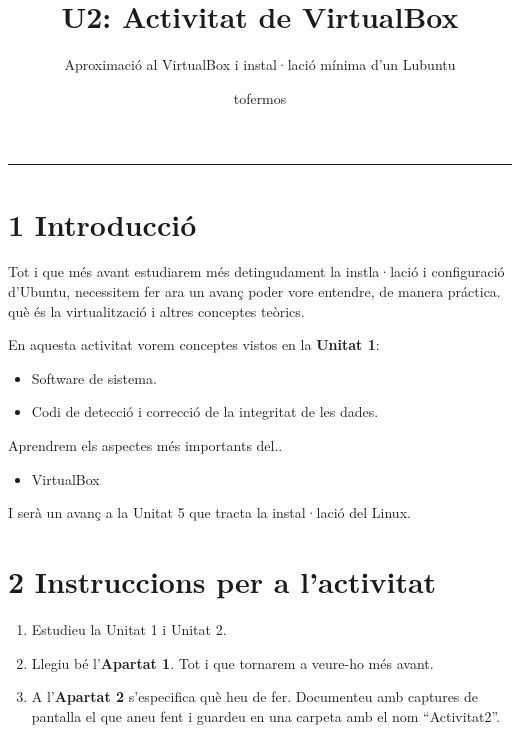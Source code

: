 \documentclass[
  12 pt,
  a4paper,
]{article}
\title{U2: Activitat de VirtualBox}
\subtitle{Aproximació al VirtualBox i instal·lació mínima d'un Lubuntu}
\author{tofermos}
\date{}
\providecommand{\tightlist}{%
  \setlength{\itemsep}{0pt}\setlength{\parskip}{0pt}}
\begin{document}
\maketitle

{
\setcounter{tocdepth}{2}
\tableofcontents
}
\newpage
\renewcommand\tablename{Tabla}

\begin{center}\rule{0.5\linewidth}{0.5pt}\end{center}

\section{1 Introducció}\label{introducciuxf3}

Tot i que més avant estudiarem més detingudament la instla·lació i
configuració d'Ubuntu, necessitem fer ara un avanç poder vore entendre,
de manera práctica. què és la virtualització i altres conceptes teòrics.

En aquesta activitat vorem conceptes vistos en la \textbf{Unitat 1}:

\begin{itemize}
\item
  Software de sistema.
\item
  Codi de detecció i correcció de la integritat de les dades.
\end{itemize}

Aprendrem els aspectes més importants del..

\begin{itemize}
\tightlist
\item
  VirtualBox
\end{itemize}

I serà un avanç a la Unitat 5 que tracta la instal·lació del Linux.

\section{2 Instruccions per a
l'activitat}\label{instruccions-per-a-lactivitat}

\begin{enumerate}
\def\labelenumi{\arabic{enumi}.}
\item
  Estudieu la Unitat 1 i Unitat 2.
\item
  Llegiu bé l'\textbf{Apartat 1}. Tot i que tornarem a veure-ho més
  avant.
\item
  A l'\textbf{Apartat 2} s'especifica què heu de fer. Documenteu amb
  captures de pantalla el que aneu fent i guardeu en una carpeta amb el
  nom ``Activitat2''.
\end{enumerate}
\end{document}
